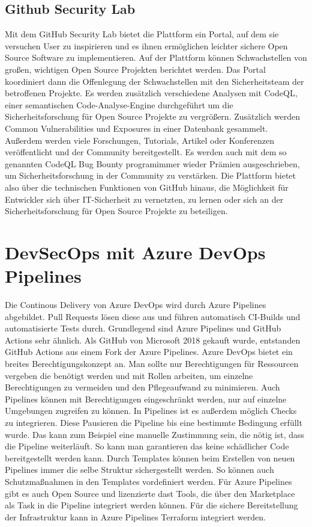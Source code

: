 \section{Github Security Lab}
Mit dem GitHub Security Lab bietet die Plattform ein Portal, auf dem sie versuchen User zu inspirieren und es ihnen ermöglichen leichter sichere Open Source Software zu implementieren. 
Auf der Plattform können Schwachstellen von großen, wichtigen Open Source Projekten berichtet werden. Das Portal koordiniert dann die Offenlegung der Schwachstellen mit den Sicherheitsteam der betroffenen Projekte. Es werden zusätzlich verschiedene Analysen mit CodeQL, einer semantischen Code-Analyse-Engine durchgeführt um die Sicherheitsforschung für Open Source Projekte zu vergrößern. Zusätzlich werden Common Vulnerabilities und Exposures in einer Datenbank gesammelt.
Außerdem werden viele Forschungen, Tutorials, Artikel oder Konferenzen veröffentlicht und der Community bereitgestellt.
Es werden auch mit dem so genannten \glqq CodeQL Bug Bounty program\grqq immer wieder Prämien ausgeschrieben, um Sicherheitsforschung in der Community zu verstärken. Die Plattform bietet also über die technischen Funktionen von GitHub hinaus, die Möglichkeit für Entwickler sich über IT-Sicherheit zu vernetzten, zu lernen oder sich an der Sicherheitsforschung für Open Source Projekte zu beteiligen. \cite{github-securitylab}

\chapter{DevSecOps mit Azure DevOps Pipelines}

Die Continous Delivery von Azure DevOps wird durch Azure Pipelines abgebildet. Pull Requests lösen diese aus und führen automatisch CI-Builds und automatisierte Tests durch. Grundlegend sind Azure Pipelines und GitHub Actions sehr ähnlich. Als GitHub von Microsoft 2018 gekauft wurde, entstanden GitHub Actions aus einem Fork der Azure Pipelines. \cite{mic-actions-pipelines} 
Azure DevOps bietet ein breites Berechtigungskonzept an. Man sollte nur Berechtigungen für Ressourcen vergeben die benötigt werden und mit Rollen arbeiten, um einzelne Berechtigungen zu vermeiden und den Pflegeaufwand zu minimieren. Auch Pipelines können mit Berechtigungen eingeschränkt werden, nur auf einzelne Umgebungen zugreifen zu können.
In Pipelines ist es außerdem möglich Checks zu integrieren. Diese Pausieren die Pipeline bis eine bestimmte Bedingung erfüllt wurde. Das kann zum Beispiel eine manuelle Zustimmung sein, die nötig ist, dass die Pipeline weiterläuft. So kann man garantieren das keine schädlicher Code bereitgestellt werden kann. \cite{mic-ressouce-protection} Durch Templates können beim Erstellen von neuen Pipelines immer die selbe Struktur sichergestellt werden. So können auch Schutzmaßnahmen in den Templates vordefiniert werden. \cite{mic-templates}
Für Azure Pipelines gibt es auch Open Source und lizenzierte \ac{dast} Tools, die über den Marketplace als Task in die Pipeline integriert werden können.
Für die sichere Bereitstellung der Infrastruktur kann in Azure Pipelines Terraform integriert werden. \cite{EdPrice-MSFT_undated-bx}

